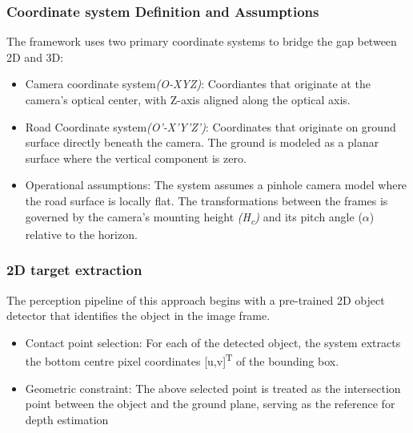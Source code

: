 \documentclass[12pt,a4paper]{report}
\begin{document}
{\subsubsection{\textbf{Coordinate system Definition and Assumptions}}
The framework uses two primary coordinate systems to bridge the gap between 2D and 3D:

 \begin{itemize}
     \item Camera coordinate system\textit{(O-XYZ)}: Coordiantes that originate at the camera’s optical center, with Z-axis aligned along the optical axis.
 \end{itemize}

 \begin{itemize}
     \item Road Coordinate system\textit{(O’-X’Y’Z’)}: Coordinates that originate on ground surface directly beneath the camera. The ground is modeled as a planar surface where the vertical component is zero.
 \end{itemize}

 \begin{itemize}
     \item Operational assumptions: The system assumes a pinhole camera model where the road surface is locally flat. The transformations between the frames is governed by the camera’s mounting height \textit{(H\textsubscript{c})} and its pitch angle ($\alpha$) relative to the horizon.
 \end{itemize}

 {\subsubsection{\textbf{2D target extraction}
}}
The perception pipeline of this approach begins with a pre-trained 2D object detector that identifies the object in the image frame.

\begin{itemize}
    \item Contact point selection: For each of the detected object, the system extracts the bottom centre pixel coordinates [u,v]\textsuperscript{T} of the bounding box.
\end{itemize}

\begin{itemize}
    \item Geometric constraint: The above selected point is treated as the intersection point between the object and the ground plane, serving as the reference for depth estimation
\end{itemize}

}
\end{document}
